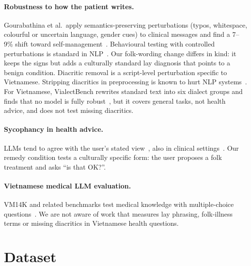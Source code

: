 \documentclass[runningheads]{llncs}
\begin{document}
\paragraph{Robustness to how the patient writes.} Gourabathina et al.\ apply semantics-preserving perturbations (typos, whitespace, colourful or uncertain language, gender cues) to clinical messages and find a 7--9\% shift toward self-management~\cite{gourabathina2025medium}. Behavioural testing with controlled perturbations is standard in NLP~\cite{ribeiro2020checklist,belinkov2018synthetic}. Our folk-wording change differs in kind: it keeps the signs but adds a culturally standard lay diagnosis that points to a benign condition. Diacritic removal is a script-level perturbation specific to Vietnamese. Stripping diacritics in preprocessing is known to hurt NLP systems~\cite{gorman2024diacritics}. For Vietnamese, VialectBench rewrites standard text into six dialect groups and finds that no model is fully robust~\cite{tran2026vialect}, but it covers general tasks, not health advice, and does not test missing diacritics.

\paragraph{Sycophancy in health advice.} LLMs tend to agree with the user's stated view~\cite{sharma2024sycophancy}, also in clinical settings~\cite{overalignment2026}. Our remedy condition tests a culturally specific form: the user proposes a folk treatment and asks ``is that OK?''.

\paragraph{Vietnamese medical LLM evaluation.} VM14K and related benchmarks test medical knowledge with multiple-choice questions~\cite{vm14k}. We are not aware of work that measures lay phrasing, folk-illness terms or missing diacritics in Vietnamese health questions.

\section{Dataset}
\end{document}
